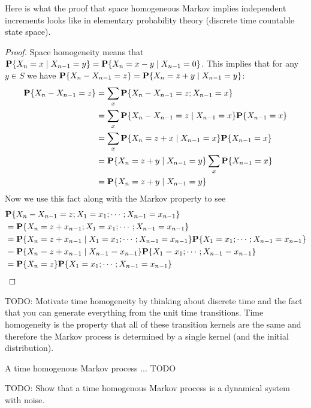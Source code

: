 Here is what the proof that space homogeneous Markov implies
independent increments looks like in elementary probability theory
(discrete time countable state space).
\begin{proof}
Space homogeneity means that $\cprobability{X_{n-1} = y}{X_n = x} =
\cprobability{X_{n-1} = 0}{X_n = x-y}$.  This implies that for any
$y\in S$ we have
$\probability{X_n - X_{n-1} = z} = \cprobability{X_{n-1} = y}{X_n =
  z+y}$:
\begin{align*}
\probability{X_n - X_{n-1} = z} &= \sum_x \probability{X_n - X_{n-1} =
  z ; X_{n-1}=x} \\
& =\sum_x \cprobability {X_{n-1}=x}{X_n - X_{n-1} =  z} \probability
{X_{n-1}=x} \\
& =\sum_x \cprobability {X_{n-1}=x}{X_n =  z+x} \probability
{X_{n-1}=x} \\
& =\cprobability {X_{n-1}=y}{X_n =  z+y} \sum_x \probability
{X_{n-1}=x} \\
&= \cprobability {X_{n-1}=y}{X_n =  z+y} 
\end{align*}
Now we use this fact along with the Markov property to see
\begin{align*}
&\probability{X_n - X_{n-1} = z; X_1=x_1 ; \cdots ; X_{n-1}=x_{n-1}} \\
&=\probability{X_n = z+x_{n-1}; X_1=x_1 ; \cdots ; X_{n-1}=x_{n-1}} \\
&=\cprobability{X_1=x_1 ; \cdots ; X_{n-1}=x_{n-1}}{X_n = z+x_{n-1}} 
\probability{X_1=x_1 ; \cdots ; X_{n-1}=x_{n-1}}\\
&=\cprobability{X_{n-1}=x_{n-1}}{X_n = z+x_{n-1}} 
\probability{X_1=x_1 ; \cdots ; X_{n-1}=x_{n-1}}\\
&=\probability{X_n = z} 
\probability{X_1=x_1 ; \cdots ; X_{n-1}=x_{n-1}}\\
\end{align*}
\end{proof}

TODO: Motivate time homogeneity by thinking about discrete time and
the fact that you can generate everything from the unit time
transitions.  Time homogeneity is the property that all of these
transition kernels are the same and therefore the Markov process is
determined by a single kernel (and the initial distribution).

\begin{defn}A time homogenous Markov process ... TODO
\end{defn}

TODO: Show that a time homogenous Markov process is a dynamical system
with noise.

